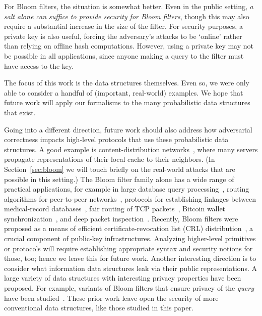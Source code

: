 For Bloom filters, the situation is somewhat better. Even in the public setting, \emph{a salt alone can suffice to provide security for Bloom filters}, though this may also require a substantial increase in the size of the filter. For security purposes, a private key is also useful, forcing the adversary's attacks to be `online' rather than relying on offline hash computations. However, using a private key may not be possible in all applications, since anyone making a query to the filter must have access to the key.

%
The focus of this work is the data structures themselves.  Even so, we
were only able to consider a handful of (important, real-world)
examples.  We hope that future work will apply our formalisms to the
many probabilistic data structures that exist.

Going into a different direction, future work should
also address how adversarial correctness impacts high-level protocols that use
these probabilistic data structures. A good example is content-distribution
networks~\cite{byers2002informed}, where many servers propagate representations
of their local cache to their neighbors. (In Section~\ref{sec:bloom} we will
touch briefly on the real-world attacks that are possible in this setting.) The
Bloom filter family alone has a wide range of practical applications, for
example in large database query processing~\cite{broder2004network}, routing
algorithms for peer-to-peer networks~\cite{reynolds2003efficient}, protocols for
establishing linkages between medical-record databases~\cite{schnell2011novel},
fair routing of TCP packets~\cite{feng2001stochastic}, Bitcoin wallet
synchronization~\cite{gervais2014privacy}, and deep packet inspection~\cite{tarkoma2012theory}.
Recently, Bloom filters were proposed as a
means of efficient certificate-revocation list (CRL)
distribution~\cite{larisch2017crlite}, a crucial component of public-key
infrastructures.
%
Analyzing higher-level primitives or protocols will require establishing
appropriate syntax and security notions for those, too; hence we leave this for
future work.
%
Another interesting direction is to consider what information data structures
leak via their public representations. A large variety of data structures with
interesting privacy properties have been proposed. For example, variants of
Bloom filters that ensure privacy of the \emph{query} have been
studied~\cite{bellovin2004privacy,nojima2009cryptographically}. These prior work
leave open the security of more conventional data structures, like those studied
in this paper.


